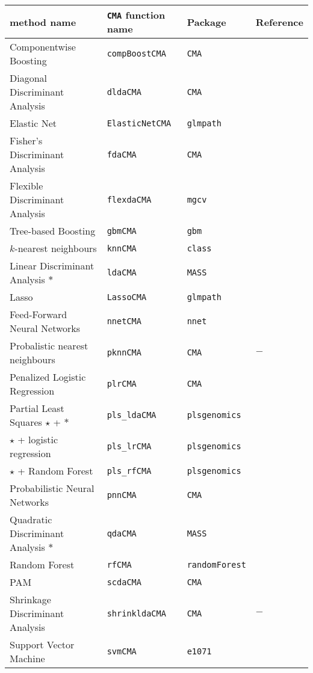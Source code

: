 \begin{table}
\begin{tabular}[h!]{llll} \label{methodsoverview}
\textbf{method name} &\texttt{CMA} \textbf{function name} & \textbf{Package} & \textbf{Reference} \\
\hline
Componentwise Boosting & \texttt{compBoostCMA} &  \texttt{CMA} & \citet{Buhlmann2003} \\
Diagonal Discriminant Analysis & \texttt{dldaCMA}      &  \texttt{CMA} & \citet{dabook} \\
Elastic Net & \texttt{ElasticNetCMA} & \texttt{glmpath} & \citet{elasticnet} \\
Fisher's Discriminant Analysis& \texttt{fdaCMA} &   \texttt{CMA}          & \citet{Ripley1996} \\
Flexible Discriminant Analysis & \texttt{flexdaCMA} & \texttt{mgcv}    &  \citet{Ripley1996} \\ 
Tree-based Boosting &\texttt{gbmCMA} & \texttt{gbm} &   \citet{Friedman2001} \\
$k$-nearest neighbours & \texttt{knnCMA} & \texttt{class}             &   \citet{Ripley1996} \\
Linear Discriminant Analysis ${\ast}$ & \texttt{ldaCMA}      &  \texttt{MASS} & \citet{dabook} \\
Lasso & \texttt{LassoCMA}      &  \texttt{glmpath} & \citet{glmpath} \\
Feed-Forward Neural Networks & \texttt{nnetCMA} & \texttt{nnet} & \citet{Ripley1996} \\
Probalistic nearest neighbours & \texttt{pknnCMA} & \texttt{CMA} & $-$ \\
Penalized Logistic Regression & \texttt{plrCMA} & \texttt{CMA} &
\citet{Zhu2004} \\
Partial Least Squares ${\star}$ + $\ast$ & \verb+pls_ldaCMA+ & \texttt{plsgenomics} &
\citet{Boulesteixpls} \\
$\star$ + logistic regression & \verb+pls_lrCMA+ & \texttt{plsgenomics} & \citet{Boulesteixpls} \\
$\star$ + Random Forest & \verb+pls_rfCMA+ & \texttt{plsgenomics} & \citet{Boulesteixpls} \\
Probabilistic Neural Networks & \texttt{pnnCMA} &  \texttt{CMA} &
\citet{specht} \\
Quadratic Discriminant Analysis ${\ast}$ & \texttt{qdaCMA}      &  \texttt{MASS} & \citet{dabook} \\ 
Random Forest &\texttt{rfCMA} & \texttt{randomForest} &   \citet{Breiman2001} \\
PAM & \texttt{scdaCMA} & \texttt{CMA} & \citet{Tibshirani2002}   \\
Shrinkage Discriminant Analysis & \texttt{shrinkldaCMA} & \texttt{CMA} &  $-$ \\
Support Vector Machine & \texttt{svmCMA} &  \texttt{e1071} &
\citet{ScholkopfSmola2002} \\
\hline
\end{tabular}
\label{tab:methods}
\end{table}


